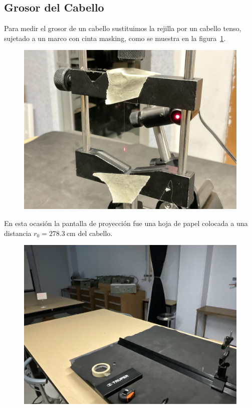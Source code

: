 \subsection{Grosor del Cabello}\label{sec: hair}
Para medir el grosor de un cabello sustituimos la rejilla por un cabello tenso, sujetado a un marco con cinta masking, como se muestra en la figura~\ref{fig: hair}.
\begin{figure}[H]
	\centering
	\includegraphics[width=.9\linewidth]{Imagenes/hair}
	\caption{}
	\label{fig: hair}
\end{figure}
En esta ocasión la pantalla de proyección fue una hoja de papel colocada a una distancia $r_0 = \qty{278.3}{\cm}$ del cabello.
\begin{figure}[H]
	\centering
	\includegraphics[width=.9\linewidth]{Imagenes/hair1}
	\caption{}
	\label{fig: hair1}
\end{figure}